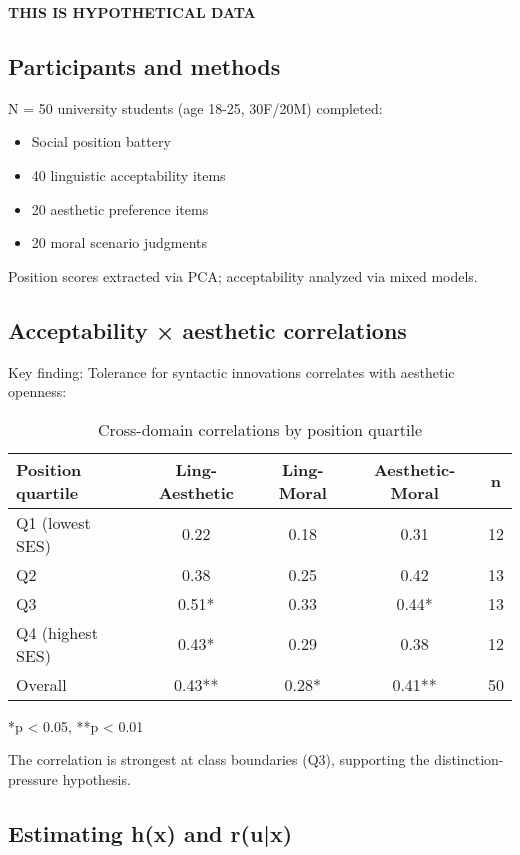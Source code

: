 \documentclass[12pt]{article}
\begin{document}
\textbf{THIS IS HYPOTHETICAL DATA}

\subsection{Participants and methods}

N = 50 university students (age 18-25, 30F/20M) completed:
\begin{itemize}
\item Social position battery
\item 40 linguistic acceptability items  
\item 20 aesthetic preference items
\item 20 moral scenario judgments
\end{itemize}

Position scores extracted via PCA; acceptability analyzed via mixed models.

\subsection{Acceptability × aesthetic correlations}

Key finding: Tolerance for syntactic innovations correlates with aesthetic openness:

\begin{table}[h]
\centering
\caption{Cross-domain correlations by position quartile}
\begin{tabular}{lcccc}
\toprule
Position quartile & Ling-Aesthetic & Ling-Moral & Aesthetic-Moral & n \\
\midrule
Q1 (lowest SES)  & 0.22 & 0.18 & 0.31 & 12 \\
Q2                & 0.38 & 0.25 & 0.42 & 13 \\
Q3                & 0.51* & 0.33 & 0.44* & 13 \\
Q4 (highest SES) & 0.43* & 0.29 & 0.38 & 12 \\
\midrule
Overall           & 0.43** & 0.28* & 0.41** & 50 \\
\bottomrule
\end{tabular}
\end{table}

*p < 0.05, **p < 0.01

The correlation is strongest at class boundaries (Q3), supporting the distinction-pressure hypothesis.

\subsection{Estimating h(x) and r(u|x)}
\end{document}
